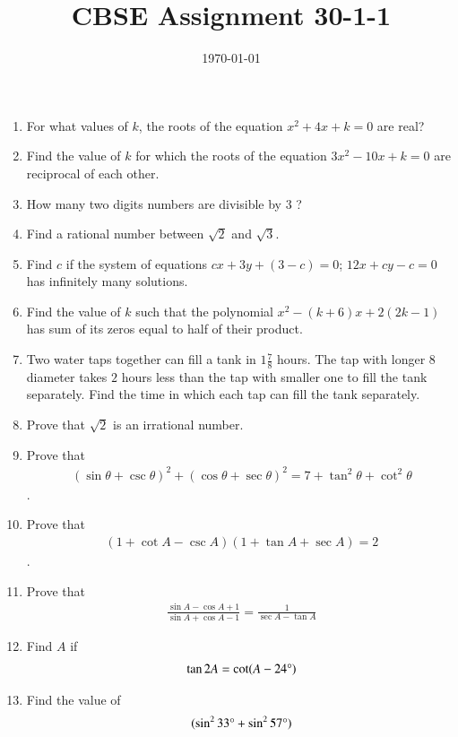 \documentclass[12pt,-letter paper]{article}
\title{CBSE Assignment 30-1-1}
\date{\today}
\providecommand{\brak}[1]{\ensuremath{\left(#1\right)}}\graphicspath{{/storage/self/primary/Download/latexnew/fig}}
\begin{document}
\maketitle{}
\begin{enumerate}
\section{Algebra}
\item For what values of $k$, the roots of the equation $x^2+4x+k = 0$ are real?
\item Find the value of $k$ for which the roots of the equation $3x^2-10x+k=0$ are reciprocal of each other.
\item How many two digits numbers are divisible by $3$ ?
\item Find a rational number between $\sqrt{2}$ and $\sqrt{3}$.

\item Find $c$ if the system of equations $cx+3y+(3-c)=0$; $12x+cy-c=0$ has infinitely many solutions.
\item Find the value of $k$ such that the polynomial $x^2-\brak{k+6}x+2\brak{2k-1}$ has sum of its zeros equal to half of their product.
\item Two water taps together can fill a tank in $1\frac{7}{8}$ hours. The tap with longer $8$ diameter takes $2$ hours less than the tap with smaller one to fill the tank separately. Find the time in which each tap can fill the tank separately.




\item Prove that $\sqrt{2}$ is an irrational number.
\item Prove that \begin{align*} \brak{\sin\theta + \csc\theta}^2 + \brak{\cos\theta + \sec\theta}^2 = 7 + \tan^2\theta + \cot^2\theta\end{align*}.
\item Prove that \begin{align*}\brak{1+\cot A - \csc A} \brak{1 + \tan A +\sec A} = 2 \end{align*}.
\item Prove that \begin{align*} \frac{\sin A-\cos A+1}{\sin A+ \cos A-1} =\frac{1}{\sec A-\tan A}\end{align*}
\item Find $A$ if \begin{align*}\tan 2A = \cot (A-24\degree)\end{align*}
\item Find the value of \begin{align*}(\sin^2 33\degree+ \sin^2 57\degree)\end{align*}





\end{enumerate}
\end{document}
